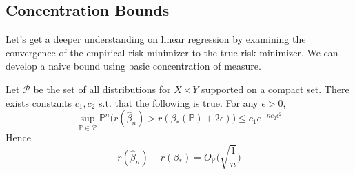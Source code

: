 \subsection{Concentration Bounds} 

  Let's get a deeper understanding on linear regression by examining the convergence of the empirical risk minimizer to the true risk minimizer. We can develop a naive bound using basic concentration of measure. 

  \begin{theorem}
    Let $\mathcal{P}$ be the set of all distributions for $X \times Y$ supported on a compact set. There exists constants $c_1, c_2$ s.t. that the following is true. For any $\epsilon > 0$, 
    \begin{equation}
      \sup_{\mathbb{P} \in \mathcal{P}} \mathbb{P}^n \big( r(\hat{\beta}_n) > r (\beta_\ast (\mathbb{P}) + 2 \epsilon )\big) \leq c_1 e^{-n c_2 \epsilon^2}
    \end{equation}
    Hence 
    \begin{equation}
      r(\hat{\beta}_n ) - r(\beta_\ast) = O_{\mathbb{P}} \bigg( \sqrt{\frac{1}{n}} \bigg)
    \end{equation}
  \end{theorem} 
